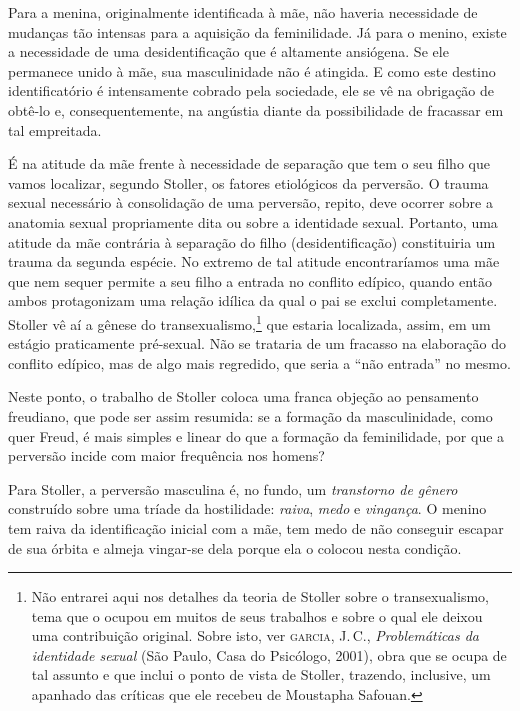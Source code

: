 Para a menina, originalmente identificada à mãe, não haveria necessidade
de mudanças tão intensas para a aquisição da feminilidade. Já para o
menino, existe a necessidade de uma desidentificação que é altamente
ansiógena. Se ele permanece unido à mãe, sua masculinidade não é
atingida. E como este destino identificatório é intensamente cobrado
pela sociedade, ele se vê na obrigação de obtê-lo e, consequentemente,
na angústia diante da possibilidade de fracassar em tal empreitada.

É na atitude da mãe frente à necessidade de separação que tem o seu
filho que vamos localizar, segundo Stoller, os fatores etiológicos da
perversão. O trauma sexual necessário à consolidação de uma perversão,
repito, deve ocorrer sobre a anatomia sexual propriamente dita ou sobre
a identidade sexual. Portanto, uma atitude da mãe contrária à separação
do filho (desidentificação) constituiria um trauma da segunda espécie.
No extremo de tal atitude encontraríamos uma mãe que nem sequer permite
a seu filho a entrada no conflito edípico, quando então ambos
protagonizam uma relação idílica da qual o pai se exclui completamente.
Stoller vê aí a gênese do transexualismo,\footnote{Não entrarei aqui nos
  detalhes da teoria de Stoller sobre o transexualismo, tema que o
  ocupou em muitos de seus trabalhos e sobre o qual ele deixou uma
  contribuição original. Sobre isto, ver \textsc{garcia}, J.\,C.,
  \emph{Problemáticas da identidade sexual} (São Paulo, Casa do
  Psicólogo, 2001), obra que se ocupa de tal assunto e que inclui o
  ponto de vista de Stoller, trazendo, inclusive, um apanhado das
  críticas que ele recebeu de Moustapha Safouan.} que estaria
localizada, assim, em um estágio praticamente pré-sexual. Não se
trataria de um fracasso na elaboração do conflito edípico, mas de algo
mais regredido, que seria a ``não entrada'' no mesmo.

Neste ponto, o trabalho de Stoller coloca uma franca objeção ao
pensamento freudiano, que pode ser assim resumida: se a formação da
masculinidade, como quer Freud, é mais simples e linear do que a
formação da feminilidade, por que a perversão incide com maior
frequência nos homens?

Para Stoller, a perversão masculina é, no fundo, um \emph{transtorno de
gênero} construído sobre uma tríade da hostilidade: \emph{raiva},
\emph{medo} e \emph{vingança}. O menino tem raiva da identificação
inicial com a mãe, tem medo de não conseguir escapar de sua órbita e
almeja vingar-se dela porque ela o colocou nesta condição.

